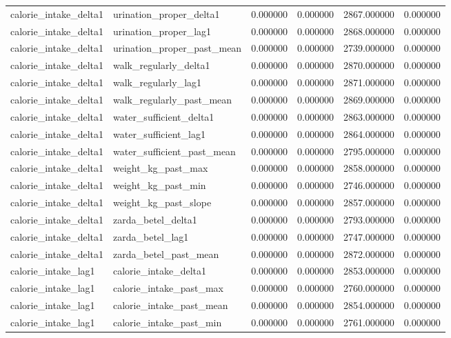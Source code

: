 \begin{longtable}{llrrrr}
calorie\_intake\_delta1 & urination\_proper\_delta1 & 0.000000 & 0.000000 & 2867.000000 & 0.000000 \\
calorie\_intake\_delta1 & urination\_proper\_lag1 & 0.000000 & 0.000000 & 2868.000000 & 0.000000 \\
calorie\_intake\_delta1 & urination\_proper\_past\_mean & 0.000000 & 0.000000 & 2739.000000 & 0.000000 \\
calorie\_intake\_delta1 & walk\_regularly\_delta1 & 0.000000 & 0.000000 & 2870.000000 & 0.000000 \\
calorie\_intake\_delta1 & walk\_regularly\_lag1 & 0.000000 & 0.000000 & 2871.000000 & 0.000000 \\
calorie\_intake\_delta1 & walk\_regularly\_past\_mean & 0.000000 & 0.000000 & 2869.000000 & 0.000000 \\
calorie\_intake\_delta1 & water\_sufficient\_delta1 & 0.000000 & 0.000000 & 2863.000000 & 0.000000 \\
calorie\_intake\_delta1 & water\_sufficient\_lag1 & 0.000000 & 0.000000 & 2864.000000 & 0.000000 \\
calorie\_intake\_delta1 & water\_sufficient\_past\_mean & 0.000000 & 0.000000 & 2795.000000 & 0.000000 \\
calorie\_intake\_delta1 & weight\_kg\_past\_max & 0.000000 & 0.000000 & 2858.000000 & 0.000000 \\
calorie\_intake\_delta1 & weight\_kg\_past\_min & 0.000000 & 0.000000 & 2746.000000 & 0.000000 \\
calorie\_intake\_delta1 & weight\_kg\_past\_slope & 0.000000 & 0.000000 & 2857.000000 & 0.000000 \\
calorie\_intake\_delta1 & zarda\_betel\_delta1 & 0.000000 & 0.000000 & 2793.000000 & 0.000000 \\
calorie\_intake\_delta1 & zarda\_betel\_lag1 & 0.000000 & 0.000000 & 2747.000000 & 0.000000 \\
calorie\_intake\_delta1 & zarda\_betel\_past\_mean & 0.000000 & 0.000000 & 2872.000000 & 0.000000 \\
calorie\_intake\_lag1 & calorie\_intake\_delta1 & 0.000000 & 0.000000 & 2853.000000 & 0.000000 \\
calorie\_intake\_lag1 & calorie\_intake\_past\_max & 0.000000 & 0.000000 & 2760.000000 & 0.000000 \\
calorie\_intake\_lag1 & calorie\_intake\_past\_mean & 0.000000 & 0.000000 & 2854.000000 & 0.000000 \\
calorie\_intake\_lag1 & calorie\_intake\_past\_min & 0.000000 & 0.000000 & 2761.000000 & 0.000000 \\

\end{longtable}
